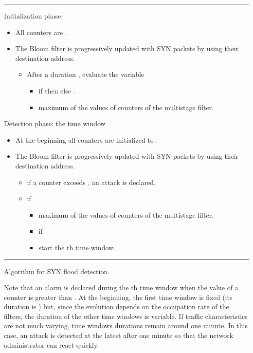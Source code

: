 \documentclass{amsart}
\begin{document}
\begin{table}
\hrule
Initialization phase:
\begin{itemize}
\item All counters are . 
\item The Bloom  filter is progressively updated with SYN packets by using their
  destination address. 
	\begin{itemize}
	\item After a duration , evaluate the variable 
		\begin{itemize}
		\item if  then  else .
		\item   maximum of the values of counters of the multistage filter.
		\end{itemize}
	\end{itemize}	
\end{itemize}	
Detection phase: the  time window
\begin{itemize}
\item At the beginning all counters are initialized to . 
\item The Bloom  filter is progressively updated with SYN packets by using their   destination address. 
	\begin{itemize}
	\item if a counter exceeds , an attack is declared.
	\item if 
		\begin{itemize}
		\item  maximum of the values of counters of the multistage filter.
		\item if  \\
        
        \item start the th time window.
		\end{itemize}
	\end{itemize}	
\end{itemize}
\hrule
\caption{Algorithm for SYN flood detection.\label{alogattack}}
\end{table}

Note that an alarm is declared during the th time window when the value of a counter is
greater than . At the beginning, the first time
window is fixed (its duration is ) but, since the evolution depends on the occupation rate of
the filters, the duration of the other time windows is variable.  If traffic characteristics are not much varying,
time windows durations remain around one minute. In this case, an attack is detected
at the latest after one minute  so that the network administrator can react quickly.
\end{document}
